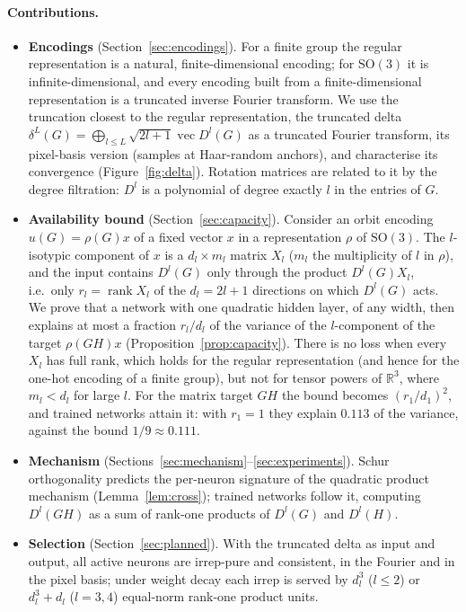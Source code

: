\documentclass[a4paper,11pt]{article}
\theoremstyle{remark}
\theoremstyle{definition}
\newcommand{\R}{\mathbb{R}}
\newcommand{\vect}{\operatorname{vec}}
\newcommand{\SO}{\mathrm{SO}(3)}
\begin{document}
\paragraph{Contributions.}
\begin{itemize}
\item \textbf{Encodings} (Section~\ref{sec:encodings}). For a finite group the
  regular representation is a natural, finite-dimensional encoding; for $\SO$ it is
  infinite-dimensional, and every encoding built from a finite-dimensional
  representation is a truncated inverse Fourier transform. We use the truncation
  closest to the regular representation, the truncated delta
  $\delta^L(G)=\bigoplus_{l\le L}\sqrt{2l+1}\vect D^l(G)$ as a truncated Fourier
  transform, its pixel-basis version (samples at Haar-random anchors), and
  characterise its convergence (Figure~\ref{fig:delta}). Rotation matrices are
  related to it by the degree filtration: $D^l$ is a polynomial of degree exactly
  $l$ in the entries of $G$.
\item \textbf{Availability bound} (Section~\ref{sec:capacity}). Consider an
  orbit encoding $u(G)=\rho(G)x$ of a fixed vector $x$ in a representation $\rho$
  of $\SO$. The $l$-isotypic component of $x$ is a $d_l\times m_l$ matrix $X_l$
  ($m_l$ the multiplicity of $l$ in $\rho$), and the input contains $D^l(G)$ only
  through the product $D^l(G)X_l$, i.e.\ only $r_l=\operatorname{rank}X_l$ of the
  $d_l=2l+1$ directions on which $D^l(G)$ acts. We prove that a network with one
  quadratic hidden layer, of any width, then explains at most a fraction
  $r_l/d_l$ of the variance of the $l$-component of the target $\rho(GH)x$
  (Proposition~\ref{prop:capacity}). There is no loss when every $X_l$ has full
  rank, which holds for the regular representation (and hence for the one-hot
  encoding of a finite group), but not for tensor powers of $\R^3$, where
  $m_l<d_l$ for large $l$. For the matrix target $GH$ the bound becomes
  $(r_1/d_1)^2$, and trained networks attain it: with $r_1=1$ they explain $0.113$ of
  the variance, against the bound $1/9\approx0.111$.
\item \textbf{Mechanism} (Sections~\ref{sec:mechanism}--\ref{sec:experiments}).
  Schur orthogonality predicts the per-neuron signature of the quadratic product
  mechanism (Lemma~\ref{lem:cross}); trained networks follow it, computing
  $D^l(GH)$ as a sum of rank-one products of $D^l(G)$ and $D^l(H)$.
\item \textbf{Selection} (Section~\ref{sec:planned}). With the truncated delta as
  input and output, all active neurons are irrep-pure and consistent, in the
  Fourier and in the pixel basis; under weight decay each irrep is served by
  $d_l^3$ ($l\le2$) or $d_l^3+d_l$ ($l=3,4$) equal-norm rank-one product units.
\end{itemize}
\end{document}
